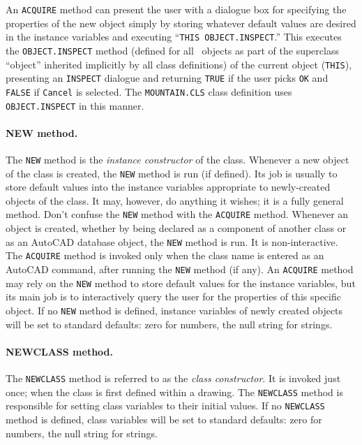 \documentclass{article}
\begin{document}
        An {\tt ACQUIRE} method can present the user with a dialogue
        box for specifying the properties of the new object simply by
        storing whatever default values are desired in the instance
        variables and executing ``{\tt THIS OBJECT.INSPECT}\@.''  This
        executes the {\tt OBJECT.INSPECT} method (defined for all
        \cw\ objects as part of the superclass ``object'' inherited
        implicitly by all class definitions) of the current object
        ({\tt THIS}), presenting an {\tt INSPECT} dialogue and
        returning {\tt TRUE} if the user picks {\tt OK} and {\tt
        FALSE} if {\tt Cancel} is selected.  The {\tt MOUNTAIN.CLS} class
        definition uses {\tt OBJECT.INSPECT} in this manner.

\paragraph{NEW method.}  The {\tt NEW} method is the {\em instance
        constructor} of the class.  Whenever a new object of the class
        is created, the {\tt NEW} method is run (if defined).  Its job
        is usually to store default values into the instance variables
        appropriate to newly-created objects of the class.  It may,
        however, do anything it wishes; it is a fully general method.
        Don't confuse the {\tt NEW} method with the {\tt ACQUIRE}
        method.  Whenever an object is created, whether by being
        declared as a component of another class or as an AutoCAD
        database object, the {\tt NEW} method is run.  It is
        non-interactive.  The {\tt ACQUIRE} method is invoked only
        when the class name is entered as an AutoCAD command, after
        running the {\tt NEW} method (if any).  An {\tt ACQUIRE}
        method may rely on the {\tt NEW} method to store default
        values for the instance variables, but its main job is to
        interactively query the user for the properties of this
        specific object.  If no {\tt NEW} method is defined, instance
        variables of newly created objects will be set to standard
        defaults: zero for numbers, the null string for strings.

\paragraph{NEWCLASS method.}  The {\tt NEWCLASS} method is referred
        to as the {\em class constructor}.  It is invoked just once;
        when the class is first defined within a drawing.
        The {\tt NEWCLASS} method is responsible for setting
        class variables to their initial values.  If no {\tt NEWCLASS}
        method is defined, class variables will be set to standard
        defaults: zero for numbers, the null string for strings.
\end{document}
